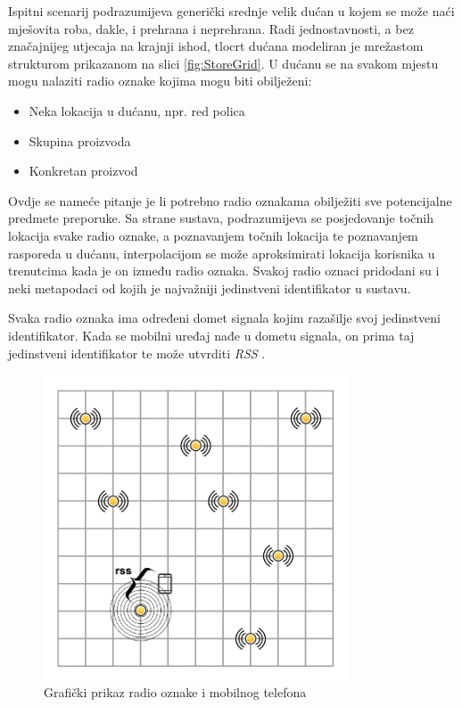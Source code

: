 \documentclass[times, utf8, diplomski, numeric]{fer}
\begin{document}
Ispitni scenarij podrazumijeva generički srednje velik dućan u kojem se
može naći mješovita roba, dakle, i prehrana i neprehrana. Radi jednostavnosti, a
bez značajnijeg utjecaja na krajnji ishod, tlocrt dućana modeliran je mrežastom
strukturom prikazanom na slici \ref{fig:StoreGrid}. U dućanu se na svakom mjestu
mogu nalaziti radio oznake  kojima mogu biti obilježeni:
\begin{itemize}
  \item Neka lokacija u dućanu, npr. red polica
  \item Skupina proizvoda
  \item Konkretan proizvod
\end{itemize}
Ovdje se nameće pitanje je li potrebno radio oznakama obilježiti sve
potencijalne predmete preporuke. Sa strane sustava, podrazumijeva se
posjedovanje točnih lokacija svake radio oznake, a poznavanjem točnih lokacija
te poznavanjem rasporeda u dućanu, interpolacijom se može aproksimirati lokacija
korisnika u trenutcima kada je on između radio oznaka. Svakoj radio oznaci
pridodani su i neki metapodaci od kojih je najvažniji jedinstveni identifikator
u sustavu.

Svaka radio oznaka ima određeni domet signala kojim razašilje 
svoj jedinstveni identifikator. Kada se mobilni uređaj nađe u dometu signala, on
prima taj jedinstveni identifikator te može utvrditi \emph{RSS} . 

\begin{figure}[!htb]
	\centering
	\includegraphics[width=9cm]{images/gridbeacons1cell.png}
	\caption{Grafički prikaz radio oznake i mobilnog telefona}
	\label{fig:RssOneCell}
\end{figure}
\end{document}
